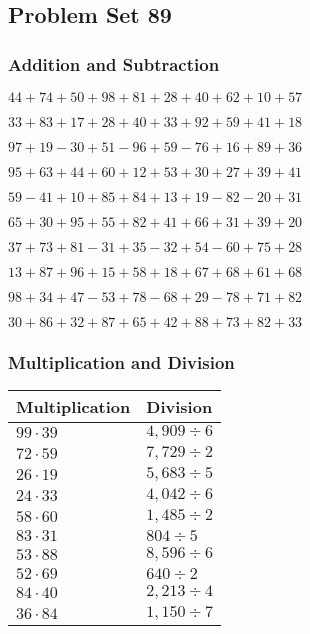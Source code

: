 \hypertarget{problem-set-89}{%
\subsection{Problem Set 89}\label{problem-set-89}}

\hypertarget{addition-and-subtraction}{%
\subsubsection{Addition and
Subtraction}\label{addition-and-subtraction}}

\(44+74+50+98+81+28+40+62+10+57\)

\(33+83+17+28+40+33+92+59+41+18\)

\(97+19-30+51-96+59-76+16+89+36\)

\(95+63+44+60+12+53+30+27+39+41\)

\(59-41+10+85+84+13+19-82-20+31\)

\(65+30+95+55+82+41+66+31+39+20\)

\(37+73+81-31+35-32+54-60+75+28\)

\(13+87+96+15+58+18+67+68+61+68\)

\(98+34+47-53+78-68+29-78+71+82\)

\(30+86+32+87+65+42+88+73+82+33\)

\hypertarget{multiplication-and-division}{%
\subsubsection{Multiplication and
Division}\label{multiplication-and-division}}

\begin{longtable}[]{@{}ll@{}}
\toprule
Multiplication & Division\tabularnewline
\midrule
\endhead
\(99\cdot39\) & \(4,909÷6\)\tabularnewline
\(72\cdot59\) & \(7,729÷2\)\tabularnewline
\(26\cdot19\) & \(5,683÷5\)\tabularnewline
\(24\cdot33\) & \(4,042÷6\)\tabularnewline
\(58\cdot60\) & \(1,485÷2\)\tabularnewline
\(83\cdot31\) & \(804÷5\)\tabularnewline
\(53\cdot88\) & \(8,596÷6\)\tabularnewline
\(52\cdot69\) & \(640÷2\)\tabularnewline
\(84\cdot40\) & \(2,213÷4\)\tabularnewline
\(36\cdot84\) & \(1,150÷7\)\tabularnewline
\bottomrule
\end{longtable}
